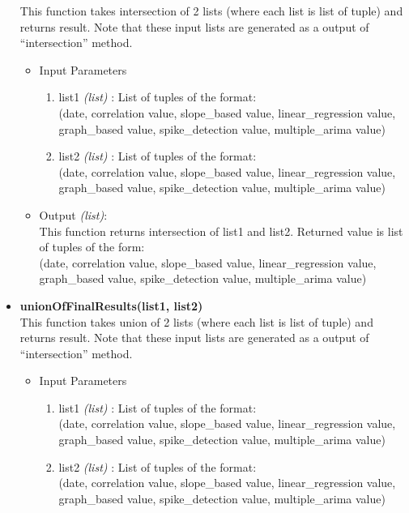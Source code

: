 \begin{itemize}
  This function takes intersection of 2 lists (where each list is list of 
tuple) and returns result. Note that these input lists are generated as a output 
of ``intersection'' method.
 \begin{itemize}
 \item Input Parameters
 
 \begin{enumerate}
  \item list1 \textit{(list)} : List of tuples of the format: \\
  (date, correlation value, slope\_based value, linear\_regression value, 
graph\_based value, spike\_detection value, multiple\_arima value)
  \item list2 \textit{(list)} :  List of tuples of the format:  \\
  (date, correlation value, slope\_based value, linear\_regression value, 
graph\_based value, spike\_detection value, multiple\_arima value)

 \end{enumerate}

 \item Output \textit{(list)}: \\
 This function returns intersection of list1 and list2. Returned value is list 
of tuples of the form: \\
 (date, correlation value, slope\_based value, linear\_regression value, 
graph\_based value, spike\_detection value, multiple\_arima value)

 \end{itemize}
 
 
 
 \item \textbf{unionOfFinalResults(list1, list2) }\\
 This function takes union of 2 lists (where each list is list of tuple) and 
returns result. Note that these input lists are generated as a output of 
``intersection'' method.
 \begin{itemize}
 \item Input Parameters
 
 \begin{enumerate}
  \item list1 \textit{(list)} : List of tuples of the format: \\
  (date, correlation value, slope\_based value, linear\_regression value, 
graph\_based value, spike\_detection value, multiple\_arima value)
  \item list2 \textit{(list)} :  List of tuples of the format:  \\
  (date, correlation value, slope\_based value, linear\_regression value, 
graph\_based value, spike\_detection value, multiple\_arima value)


\end{enumerate}
\end{itemize}
\end{itemize}
